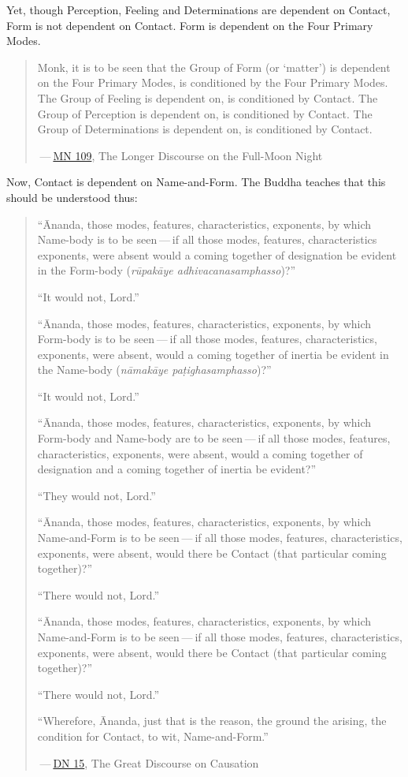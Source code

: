 Yet, though Perception, Feeling and Determinations are dependent on Contact, Form is not dependent on Contact. Form is dependent on the Four Primary Modes.

\begin{quote}
\protect\hypertarget{dependent}{}{}Monk, it is to be seen that the Group of Form (or `matter') is dependent on the Four Primary Modes, is conditioned by the Four Primary Modes. The Group of Feeling is dependent on, is conditioned by Contact. The Group of Perception is dependent on, is conditioned by Contact. The Group of Determinations is dependent on, is conditioned by Contact.

 --- \href{https://suttacentral.net/mn109/en/sujato}{MN 109}, The Longer Discourse on the Full-Moon Night
\end{quote}

Now, Contact is dependent on Name-and-Form. The Buddha teaches that this should be understood thus:

\begin{quote}
``Ānanda, those modes, features, characteristics, exponents, by which Name-body is to be seen --- if all those modes, features, characteristics exponents, were absent would a coming together of designation be evident in the Form-body (\emph{rūpakāye adhivacanasamphasso})?''

``It would not, Lord.''

``Ānanda, those modes, features, characteristics, exponents, by which Form-body is to be seen --- if all those modes, features, characteristics, exponents, were absent, would a coming together of inertia be evident in the Name-body (\emph{nāmakāye paṭighasamphasso})?''

``It would not, Lord.''

``Ānanda, those modes, features, characteristics, exponents, by which Form-body and Name-body are to be seen --- if all those modes, features, characteristics, exponents, were absent, would a coming together of designation and a coming together of inertia be evident?''

``They would not, Lord.''

``Ānanda, those modes, features, characteristics, exponents, by which Name-and-Form is to be seen --- if all those modes, features, characteristics, exponents, were absent, would there be Contact (that particular coming together)?''

``There would not, Lord.''

``Ānanda, those modes, features, characteristics, exponents, by which Name-and-Form is to be seen --- if all those modes, features, characteristics, exponents, were absent, would there be Contact (that particular coming together)?''

``There would not, Lord.''

``Wherefore, Ānanda, just that is the reason, the ground the arising, the condition for Contact, to wit, Name-and-Form.''

 --- \href{https://suttacentral.net/dn15/en/bodhi}{DN 15}, The Great Discourse on Causation
\end{quote}

